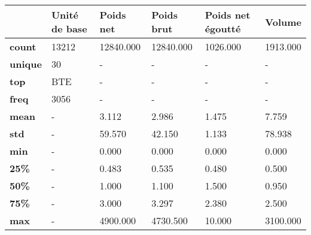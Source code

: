 \begin{tabularx}{\linewidth}{lXXXXX}
\toprule
{} & Unité de base &  Poids net &  Poids brut &  Poids net égoutté &    Volume \\
\midrule
\textbf{count } &         13212 &  12840.000 &   12840.000 &           1026.000 &  1913.000 \\
\textbf{unique} &            30 &          - &           - &                  - &         - \\
\textbf{top   } &           BTE &          - &           - &                  - &         - \\
\textbf{freq  } &          3056 &          - &           - &                  - &         - \\
\textbf{mean  } &             - &      3.112 &       2.986 &              1.475 &     7.759 \\
\textbf{std   } &             - &     59.570 &      42.150 &              1.133 &    78.938 \\
\textbf{min   } &             - &      0.000 &       0.000 &              0.000 &     0.000 \\
\textbf{25\%   } &             - &      0.483 &       0.535 &              0.480 &     0.500 \\
\textbf{50\%   } &             - &      1.000 &       1.100 &              1.500 &     0.950 \\
\textbf{75\%   } &             - &      3.000 &       3.297 &              2.380 &     2.500 \\
\textbf{max   } &             - &   4900.000 &    4730.500 &             10.000 &  3100.000 \\
\bottomrule
\end{tabularx}
